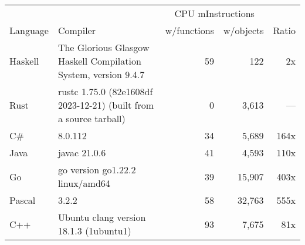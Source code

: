 \documentclass{article}
\begin{document}
      \begin{tabularx}{\linewidth}{lXrrr}
      \toprule
        & & \multicolumn{2}{c}{CPU mInstructions} & \\
        Language & Compiler & w/functions & w/objects & Ratio \\
      \midrule
    Haskell & The Glorious Glasgow Haskell Compilation System, version 9.4.7 & 59 & 122 & 2x \\
Rust & rustc 1.75.0 (82e1608df 2023-12-21) (built from a source tarball) & 0 & 3,613 & --- \\
C\# & 8.0.112 & 34 & 5,689 & 164x \\
Java & javac 21.0.6 & 41 & 4,593 & 110x \\
Go & go version go1.22.2 linux/amd64 & 39 & 15,907 & 403x \\
Pascal & 3.2.2 & 58 & 32,763 & 555x \\
C++ & Ubuntu clang version 18.1.3 (1ubuntu1) & 93 & 7,675 & 81x \\

      \bottomrule
      \end{tabularx}
      
\end{document}
